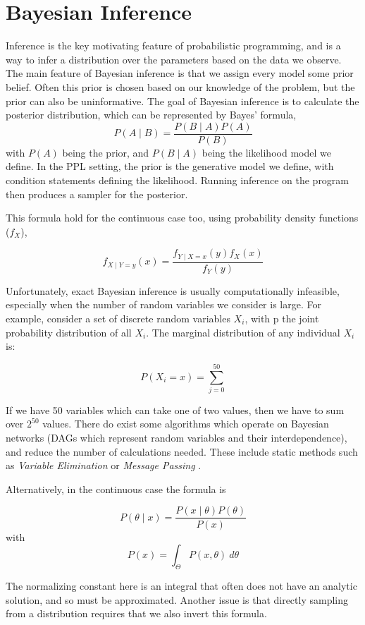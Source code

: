 \section{Bayesian Inference}
Inference is the key motivating feature of probabilistic programming, and is a way to infer a distribution over the parameters based on the data we observe. The main feature of Bayesian inference is that we assign every model some prior belief. Often this prior is chosen based on our knowledge of the problem, but the prior can also be uninformative. The goal of Bayesian inference is to calculate the posterior distribution, which can be represented by Bayes' formula,
$$P(A\mid B)={\frac {P(B\mid A)P(A)}{P(B)}}$$
with $P(A)$ being the prior, and $P(B\mid A)$ being the likelihood model we define. In the PPL setting, the prior is the generative model we define, with condition statements defining the likelihood. Running inference on the program then produces a sampler for the posterior.

This formula hold for the continuous case too, using probability density functions ($f_X$),

$$ f_{X\mid Y=y}(x)={\frac {f_{Y\mid X=x}(y)f_{X}(x)}{f_{Y}(y)}} $$

Unfortunately, exact Bayesian inference is usually computationally infeasible, especially when the number of random variables we consider is large. For example, consider a set of discrete random variables ${X_i}$, with p the joint probability distribution of all $X_i$. The marginal distribution of any individual $X_i$ is:

$$P(X_i=x) = \sum_{j=0}^{50} $$

If we have 50 variables which can take one of two values, then we have to sum over $2^{50}$ values. There do exist some algorithms which operate on Bayesian networks (DAGs which represent random variables and their interdependence), and reduce the number of calculations needed. These include static methods such as \textit{Variable Elimination} or \textit{Message Passing} \cite{belief-prop}.

Alternatively, in the continuous case the formula is

$$P(\theta\mid x)=\frac{P(x\mid\theta)P(\theta)}{P(x)}$$
with 
$$P(x)=\int_{\Theta}P(x,\theta)~d\theta $$

The normalizing constant here is an integral that often does not have an analytic solution, and so must be approximated. Another issue is that directly sampling from a distribution requires that we also invert this formula.


